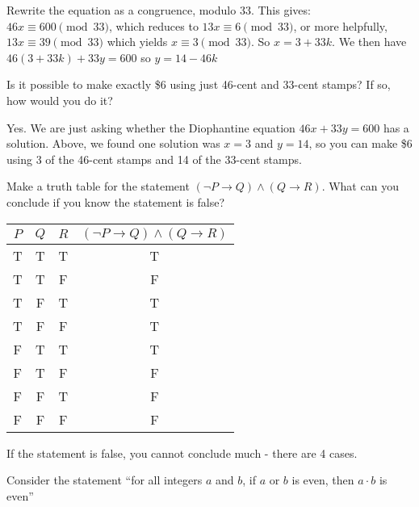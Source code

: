 \begin{squestions}
	\begin{answer}
		Rewrite the equation as a congruence, modulo 33.  This gives: $46x \equiv 600 \pmod{33}$, which reduces to $13x \equiv 6 \pmod{33}$, or more helpfully, $13x \equiv 39 \pmod{33}$ which yields $x \equiv 3 \pmod{33}$.  So $x = 3 + 33k$.  We then have $46(3+33k) + 33y = 600$ so $y = 14 - 46k$
	\end{answer}




\question Is it possible to make exactly \$6 using just 46-cent and 33-cent stamps?  If so, how would you do it?

	\begin{answer}
		Yes.  We are just asking whether the Diophantine equation $46x + 33y = 600$ has a solution.  Above, we found one solution was $x = 3$ and $y = 14$, so you can make \$6 using 3 of the 46-cent stamps and 14 of the 33-cent stamps.
	\end{answer}




\question Make a truth table for the statement $(\neg P \rightarrow Q) \wedge (Q \rightarrow R)$.  What can you conclude if you know the statement is false?

  \begin{answer}
  
  \begin{tabular}{c|c|c|c}
	 $P$ & $Q$ & $R$ & $(\neg P \rightarrow Q) \wedge (Q \rightarrow R)$ \\ \hline
	 T & T & T & T\\
	 T & T & F & F\\
	 T & F & T & T\\
	 T & F & F & T\\
	 F & T & T & T\\
	 F & T & F & F\\
	 F & F & T & F\\
	 F & F & F & F\\
  \end{tabular}

  If the statement is false, you cannot conclude much - there are 4 cases.
  \end{answer}






\question Consider the statement ``for all integers $a$ and $b$, if $a$ or $b$ is even, then $a\cdot b$ is even''
\end{squestions}
